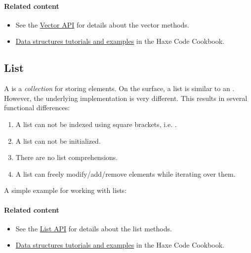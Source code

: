 \paragraph{Related content}
\begin{itemize}
	\item See the \href{https://api.haxe.org/haxe/ds/Vector.html}{Vector API} for details about the vector methods. 
	\item \href{http://code.haxe.org/category/data-structures/}{Data structures tutorials and examples} in the Haxe Code Cookbook.
\end{itemize}


\subsection{List}
\label{std-List}
A  is a \emph{collection} for storing elements.  On the surface, a list is similar to an .  However, the underlying implementation is very different.  This results in several functional differences:

\begin{enumerate}
	\item A list can not be indexed using square brackets, i.e. \expr{[0]}.
	\item A list can not be initialized.
	\item There are no list comprehensions.
	\item A list can freely modify/add/remove elements while iterating over them.
\end{enumerate}

A simple example for working with lists:

\paragraph{Related content}
\begin{itemize}
	\item See the \href{https://api.haxe.org/List.html}{List API} for details about the list methods. 
	\item \href{http://code.haxe.org/category/data-structures/}{Data structures tutorials and examples} in the Haxe Code Cookbook.
\end{itemize}

